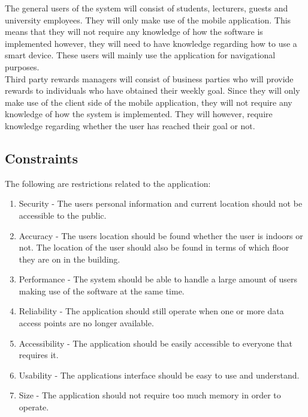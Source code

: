 \documentclass[11pt, a4paper]{article}
\begin{document}
	The general users of the system will consist of students,  lecturers,  guests and university employees. They will only make use of the mobile application. This means that they will not require any knowledge of how the software is implemented however,  they will need to have knowledge regarding how to use a smart device. These users will mainly use the application for navigational purposes.
	\\

	Third party rewards managers will consist of business parties who will provide rewards to individuals who have obtained their weekly goal. Since they will only make use of the client side of the mobile application, they will not require any knowledge of how the system is implemented. They will however, require knowledge regarding whether the user has reached their goal or not.

	\subsection{Constraints}
	The following are restrictions related to the application:
		\begin{enumerate}
				\renewcommand{\labelenumi}{{\textbf{\arabic{enumi}.}}}
				\item Security  - The users personal information and current location should not be accessible to the public.
				\item Accuracy - The users location should be found whether the user is indoors or not. The location of the user should also be found in terms of which floor they are on in the building.
				\item Performance - The system should be able to handle a large amount of users making use of the software at the same time.
				\item Reliability - The application should still operate when one or more data access points are no longer available.
				\item Accessibility - The application should be easily accessible to everyone that requires it.
				\item Usability - The applications interface should be easy to use and understand.
				\item Size - The application should not require too much memory in order to operate.
				\end{enumerate}
	\newpage
\end{document}
